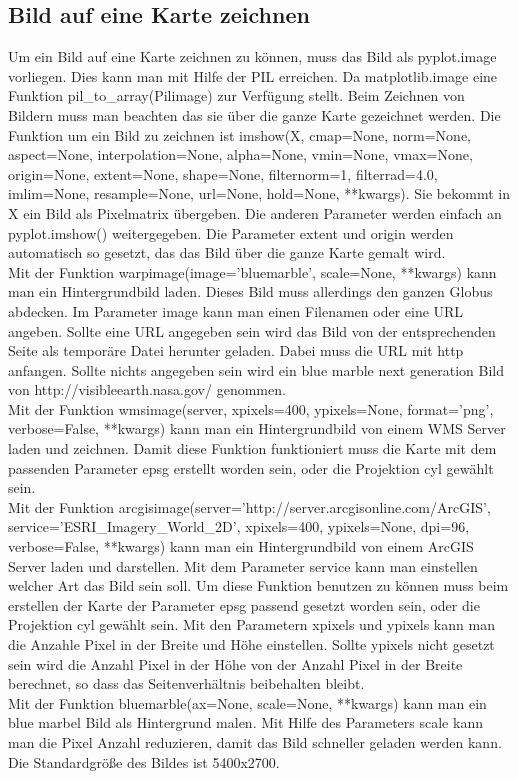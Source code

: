 \subsection{Bild auf eine Karte zeichnen}\label{bilder} 
Um ein Bild auf eine Karte zeichnen zu können, muss das Bild als \textsf{pyplot.image} vorliegen. Dies kann man mit Hilfe der \textsf{PIL} erreichen. Da \textsf{matplotlib.image} eine Funktion \textsf{pil\_to\_array(Pilimage)} zur Verfügung stellt. Beim Zeichnen von Bildern muss man beachten das sie über die ganze Karte gezeichnet werden. Die Funktion um ein Bild zu zeichnen ist \textsf{imshow(X, cmap=None, norm=None, aspect=None, interpolation=None, alpha=None, vmin=None, vmax=None, origin=None, extent=None, shape=None, filternorm=1, filterrad=4.0, imlim=None, resample=None, url=None, hold=None, **kwargs)}. Sie bekommt in \textsf{X} ein Bild als Pixelmatrix übergeben. Die anderen Parameter werden einfach an \textsf{pyplot.imshow()} weitergegeben. Die Parameter \textsf{extent} und \textsf{origin} werden automatisch so gesetzt, das das Bild über die ganze Karte gemalt wird.\\
Mit der Funktion \textsf{warpimage(image='bluemarble', scale=None, **kwargs)} kann man ein Hintergrundbild laden. Dieses Bild muss allerdings den ganzen Globus abdecken. Im Parameter \textsf{image} kann man einen Filenamen oder eine URL angeben. Sollte eine URL angegeben sein wird das Bild von der entsprechenden Seite als temporäre Datei herunter geladen. Dabei muss die URL mit \textsf{http} anfangen. Sollte nichts angegeben sein wird ein \textsf{blue marble next generation} Bild von  
\textsf{http://visibleearth.nasa.gov/} genommen.\\
Mit der Funktion \textsf{wmsimage(server, xpixels=400, ypixels=None, format='png', verbose=False, **kwargs)} kann man ein Hintergrundbild von einem WMS Server laden und zeichnen. Damit diese Funktion funktioniert muss die Karte mit dem passenden Parameter \textsf{epsg} erstellt worden sein, oder die Projektion \textsf{cyl} gewählt sein.\\
Mit der Funktion \textsf{arcgisimage(server='http://server.arcgisonline.com/ArcGIS', service='ESRI\_Imagery\_World\_2D', xpixels=400, ypixels=None, dpi=96, verbose=False, **kwargs)} kann man ein Hintergrundbild von einem ArcGIS Server laden und darstellen. Mit dem Parameter \textsf{service} kann man einstellen welcher Art das Bild sein soll. Um diese Funktion benutzen zu können muss beim erstellen der Karte der Parameter \textsf{epsg} passend gesetzt worden sein, oder die Projektion \textsf{cyl} gewählt sein. Mit den Parametern \textsf{xpixels} und \textsf{ypixels} kann man die Anzahle Pixel in der Breite und Höhe einstellen. Sollte \textsf{ypixels} nicht gesetzt sein wird die Anzahl Pixel in der Höhe von der Anzahl Pixel in der Breite berechnet, so dass das Seitenverhältnis beibehalten bleibt.\\
Mit der Funktion \textsf{bluemarble(ax=None, scale=None, **kwargs)} kann man ein \textsf{blue marbel} Bild als Hintergrund malen. Mit Hilfe des Parameters \textsf{scale} kann man die Pixel Anzahl reduzieren, damit das Bild schneller geladen werden kann. Die Standardgröße des Bildes ist 5400x2700.